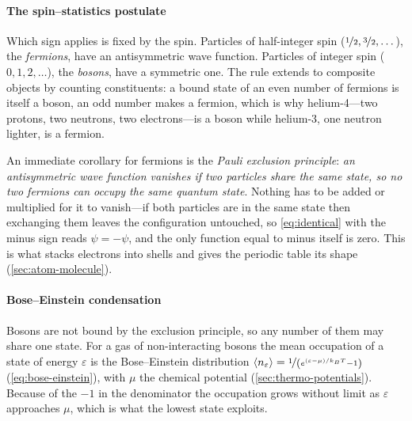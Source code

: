     \paragraph{The spin--statistics postulate}

        Which sign applies is fixed by the spin. Particles of half-integer spin ($\nicefrac{1}{2}, \nicefrac{3}{2}, \dots$), the \emph{fermions}, have an antisymmetric wave function. Particles of integer spin ($0,1,2,\dots$), the \emph{bosons}, have a symmetric one. The rule extends to composite objects by counting constituents: a bound state of an even number of fermions is itself a boson, an odd number makes a fermion, which is why helium-4---two protons, two neutrons, two electrons---is a boson while helium-3, one neutron lighter, is a fermion.

        An immediate corollary for fermions is the \emph{Pauli exclusion principle}: \emph{an antisymmetric wave function vanishes if two particles share the same state, so no two fermions can occupy the same quantum state}. Nothing has to be added or multiplied for it to vanish---if both particles are in the same state then exchanging them leaves the configuration untouched, so \cref{eq:identical} with the minus sign reads $\psi = -\psi$, and the only function equal to minus itself is zero. This is what stacks electrons into shells and gives the periodic table its shape (\cref{sec:atom-molecule}).

    \paragraph{Bose--Einstein condensation}

        Bosons are not bound by the exclusion principle, so any number of them may share one state. For a gas of non-interacting bosons the mean occupation of a state of energy $\varepsilon$ is the Bose--Einstein distribution $\langle n_\varepsilon \rangle = \nicefrac{1}{\left(e^{(\varepsilon-\mu)/k_{B} T}-1\right)}$ (\cref{eq:bose-einstein}), with $\mu$ the chemical potential (\cref{sec:thermo-potentials}). Because of the $-1$ in the denominator the occupation grows without limit as $\varepsilon$ approaches $\mu$, which is what the lowest state exploits.

